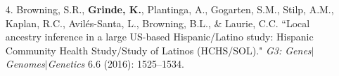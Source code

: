 \documentclass[margin]{res}
\begin{document}
\begin{resume}
\begin{itemize}
\item[4.] Browning, S.R., \textbf{Grinde, K.}, Plantinga, A., Gogarten, S.M., Stilp, A.M., Kaplan, R.C., Avil\'es-Santa, L., Browning, B.L., \& Laurie, C.C. ``Local ancestry inference in a large US-based Hispanic/Latino study: Hispanic Community Health Study/Study of Latinos (HCHS/SOL)." \textit{G3: Genes}$|$\textit{Genomes}$|$\textit{Genetics} 6.6 (2016): 1525--1534.
	

\end{itemize}
\end{resume}
\end{document}
